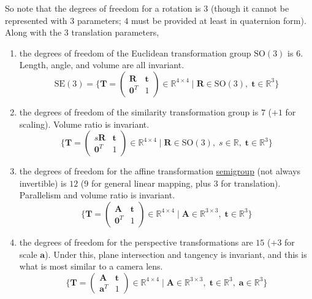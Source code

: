 \documentclass{article}
\begin{document}
  So note that the degrees of freedom for a rotation is $3$ (though it cannot be represented with $3$ parameters; $4$ must be provided at least in quaternion form). Along with the $3$ translation parameters, 
  \begin{enumerate}
      \item the degrees of freedom of the Euclidean transformation group $\mathrm{SO}(3)$ is $6$. Length, angle, and volume are all invariant. 
      \begin{equation}
        \mathrm{SE}(3) = \bigg\{ \mathbf{T} = \begin{pmatrix} \mathbf{R} & \mathbf{t} \\ \mathbf{0}^T & 1 \end{pmatrix} \in \mathbb{R}^{4 \times 4} \mid \mathbf{R} \in \mathrm{SO}(3), \; \mathbf{t} \in \mathbb{R}^3 \bigg\}
      \end{equation}
      
      \item the degrees of freedom of the similarity transformation group is $7$ ($+1$ for scaling). Volume ratio is invariant. 
      \begin{equation}
        \bigg\{ \mathbf{T} = \begin{pmatrix} s \mathbf{R} & \mathbf{t} \\ \mathbf{0}^T & 1 \end{pmatrix} \in \mathbb{R}^{4 \times 4} \mid \mathbf{R} \in \mathrm{SO}(3), \; s \in \mathbb{R}, \; \mathbf{t} \in \mathbb{R}^3 \bigg\}
      \end{equation}
      
      \item the degrees of freedom for the affine transformation \hyperref[alg-def:semigroup]{semigroup} (not always invertible) is $12$ ($9$ for general linear mapping, plus $3$ for translation). Parallelism and volume ratio is invariant. 
      \begin{equation}
        \bigg\{ \mathbf{T} = \begin{pmatrix} \mathbf{A} & \mathbf{t} \\ \mathbf{0}^T & 1 \end{pmatrix} \in \mathbb{R}^{4 \times 4} \mid \mathbf{A} \in \mathbb{R}^{3 \times 3}, \; \mathbf{t} \in \mathbb{R}^3 \bigg\}
      \end{equation}
      
      \item the degrees of freedom for the perspective transformations are $15$ ($+3$ for scale $\mathbf{a}$). Under this, plane intersection and tangency is invariant, and this is what is most similar to a camera lens. 
      \begin{equation}
        \bigg\{ \mathbf{T} = \begin{pmatrix} \mathbf{A} & \mathbf{t} \\ \mathbf{a}^T & 1 \end{pmatrix} \in \mathbb{R}^{4 \times 4} \mid \mathbf{A} \in \mathbb{R}^{3 \times 3}, \; \mathbf{t} \in \mathbb{R}^3, \; \mathbf{a} \in \mathbb{R}^3 \bigg\}
      \end{equation}
  \end{enumerate}
\end{document}
